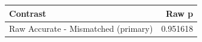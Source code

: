 \begin{tabular}{lr}
\toprule
Contrast & Raw p \\
\midrule
Raw Accurate - Mismatched (primary) & 0.951618 \\
\bottomrule
\end{tabular}
